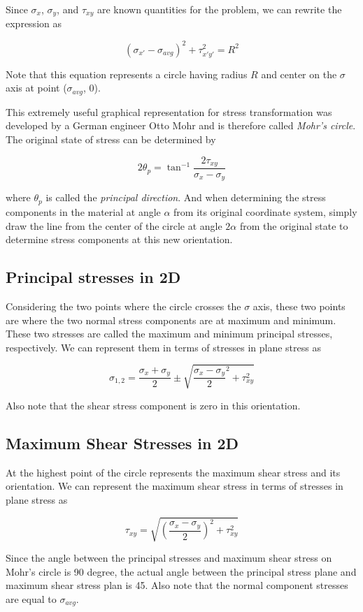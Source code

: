 \documentclass[a4paper,openany,12pt]{book}
\begin{document}
Since \(\sigma_x\), \(\sigma_y\), and \(\tau_{xy}\) are known quantities for
the problem, we can rewrite the expression as

$$(\sigma_{x'} - \sigma_{avg})^2 + \tau_{x'y'}^2 = R^2$$

Note that this equation represents a circle having radius \(R\) and center
on the \(\sigma\) axis at point (\(\sigma_{avg}\), 0).


This extremely useful graphical representation for stress transformation
was developed by a German engineer Otto Mohr and is therefore called
\emph{Mohr's circle}. The original state of stress can be determined by

$$2\theta_p = \tan ^{-1}\frac{2\tau_{xy}}{\sigma_x - \sigma_y}$$

where \(\theta _p\) is called the \emph{principal direction}. And when
determining the stress components in the material at angle \(\alpha\) from
its original coordinate system, simply draw the line from the center of
the circle at angle \(2\alpha\) from the original state to determine
stress components at this new orientation.

\subsection{Principal stresses in 2D}
\label{principal-stresses-in-2d}
Considering the two points where the circle crosses the \(\sigma\) axis,
these two points are where the two normal stress components are at
maximum and minimum. These two stresses are called the maximum and
minimum principal stresses, respectively. We can represent them in terms
of stresses in plane stress as

$$\sigma_{1,2} = \frac{\sigma_x + \sigma_y}{2} \pm \sqrt {\frac{\sigma_x - \sigma_y}{2}^2 + \tau_{xy}^2}$$

Also note that the shear stress component is zero in this orientation.

\subsection{Maximum Shear Stresses in 2D}
\label{maximum-shear-stresses-in-2d}
At the highest point of the circle represents the maximum shear stress
and its orientation. We can represent the maximum shear stress in terms
of stresses in plane stress as

$$ \tau_{xy} = \sqrt {\left( \frac{\sigma_x - \sigma_y}{2} \right)^2 + \tau_{xy}^2}$$

Since the angle between the principal stresses and maximum shear stress
on Mohr's circle is 90 degree, the actual angle between the principal
stress plane and maximum shear stress plan is 45. Also note that the
normal component stresses are equal to \(\sigma_{avg}\).
\end{document}
